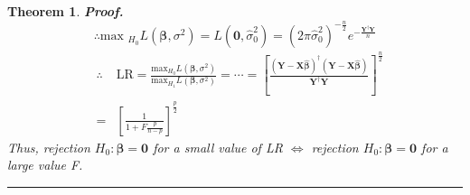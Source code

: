 \documentclass{article}
\newtheorem{theorem}{Theorem}
\newenvironment{proof}[1][Proof]{\noindent\textbf{#1.} }{\ \rule{0.5em}{0.5em}}
\begin{document}
\begin{theorem}
\begin{proof}
\begin{equation*}
\therefore \text{max }_{H_{0}}L\left( \mathbf{\beta },\sigma ^{2}\right)
=L\left( \mathbf{0},\hat{\sigma}_{0}^{2}\right) =\left( 2\pi \hat{\sigma}%
_{0}^{2}\right) ^{-\frac{n}{2}}e^{-\frac{\mathbf{Y}^{\dagger }\mathbf{Y}}{n}}
\end{equation*}%
\begin{eqnarray*}
&\therefore &\text{LR}=\frac{\text{max}_{H_{0}}L\left( \mathbf{\beta }%
,\sigma ^{2}\right) }{\text{max}_{H_{1}}L\left( \mathbf{\beta },\sigma
^{2}\right) }=\cdots =\left[ \frac{\left( \mathbf{Y-X\hat{\beta}}\right)
^{\dagger }\left( \mathbf{Y-X\hat{\beta}}\right) }{\mathbf{Y}^{\dagger }%
\mathbf{Y}}\right] ^{\frac{n}{2}} \\
&=&\left[ \frac{1}{1+F\frac{p}{n-p}}\right] ^{\frac{p}{2}}
\end{eqnarray*}%
\newline
Thus, rejection $H_{0}:\mathbf{\beta =0}$ for a small value of LR $%
\Leftrightarrow $ rejection $H_{0}:\mathbf{\beta =0}$ for a large value F.
\end{proof}
\end{theorem}
\end{document}
